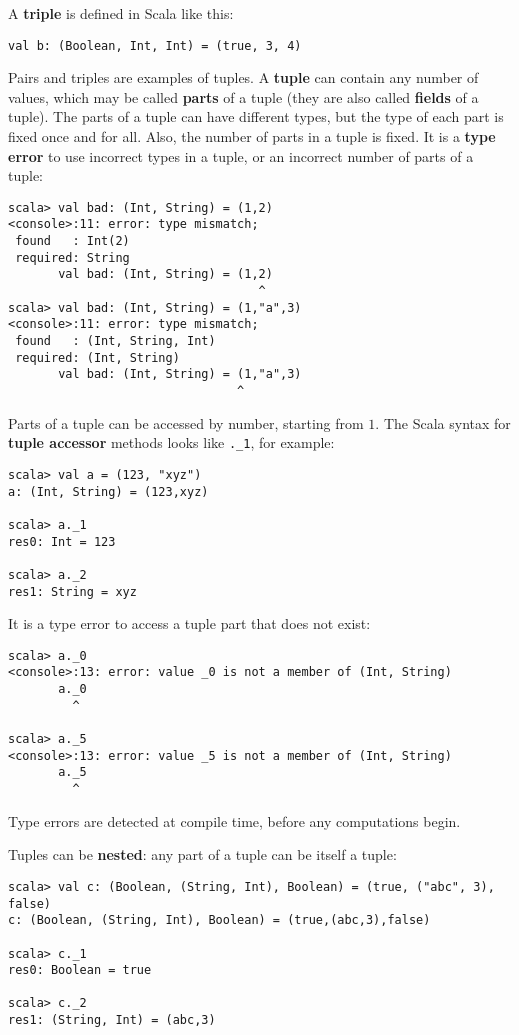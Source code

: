 A \textbf{triple} is defined in Scala like this:
\begin{lstlisting}
val b: (Boolean, Int, Int) = (true, 3, 4)
\end{lstlisting}
Pairs and triples are examples of tuples. A \textbf{tuple} can contain
any number of values, which may be called \textbf{parts}
of a tuple (they are also called \textbf{fields} of
a tuple). The parts of a tuple can have different types, but the type
of each part is fixed once and for all. Also, the number of parts
in a tuple is fixed. It is a \textbf{type error}
to use incorrect types in a tuple, or an incorrect number of parts
of a tuple:
\begin{lstlisting}
scala> val bad: (Int, String) = (1,2)
<console>:11: error: type mismatch;
 found   : Int(2)
 required: String
       val bad: (Int, String) = (1,2)
                                   ^
scala> val bad: (Int, String) = (1,"a",3)
<console>:11: error: type mismatch;
 found   : (Int, String, Int)
 required: (Int, String)
       val bad: (Int, String) = (1,"a",3)
                                ^
\end{lstlisting}
Parts of a tuple can be accessed by number, starting from $1$. The
Scala syntax for \textbf{tuple accessor}
methods looks like \lstinline!._1!, for example:
\begin{lstlisting}
scala> val a = (123, "xyz")
a: (Int, String) = (123,xyz)

scala> a._1
res0: Int = 123

scala> a._2
res1: String = xyz 
\end{lstlisting}
It is a type error to access a tuple part that does not exist:
\begin{lstlisting}
scala> a._0
<console>:13: error: value _0 is not a member of (Int, String)
       a._0
         ^

scala> a._5
<console>:13: error: value _5 is not a member of (Int, String)
       a._5
         ^
\end{lstlisting}
Type errors are detected at compile time, before
any computations begin.

Tuples can be \textbf{nested}: any part of a
tuple can be itself a tuple:
\begin{lstlisting}
scala> val c: (Boolean, (String, Int), Boolean) = (true, ("abc", 3), false)
c: (Boolean, (String, Int), Boolean) = (true,(abc,3),false)

scala> c._1
res0: Boolean = true

scala> c._2
res1: (String, Int) = (abc,3)
\end{lstlisting}

